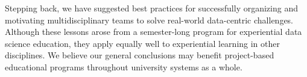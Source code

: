 \documentclass[12pt]{article}
\begin{document}
Stepping back, we have suggested best practices for successfully organizing and motivating multidisciplinary teams to solve real-world data-centric challenges.  Although these lessons arose from a semester-long program for experiential data science education, they apply equally well to experiential learning in other disciplines.  We believe our general conclusions may benefit project-based educational programs throughout university systems as a whole.



\newpage

%
%

\newpage
\printbibliography
\end{document}
